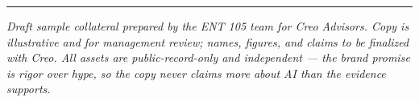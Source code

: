 \documentclass[11pt]{article}
\begin{document}
\vspace{4pt}\hrule\vspace{4pt}
{\footnotesize\itshape Draft sample collateral prepared by the ENT 105 team for Creo Advisors.
Copy is illustrative and for management review; names, figures, and claims to be finalized with
Creo. All assets are public-record-only and independent --- the brand promise is rigor over hype,
so the copy never claims more about AI than the evidence supports.}
\end{document}
